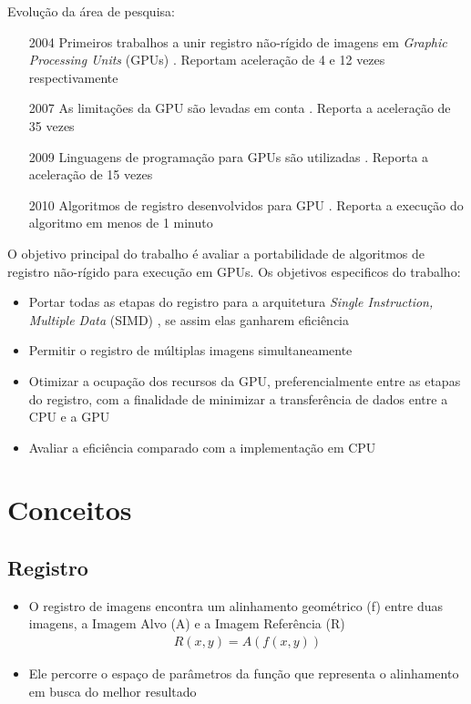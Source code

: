 \documentclass[t]{beamer}
\begin{document}
\begin{frame}
  Evolução da área de pesquisa:
  \begin{itemize}
      \item[2004] Primeiros trabalhos a unir registro não-rígido de imagens em \textit{Graphic Processing Units} (GPUs) 
                  \cite{strzodka2004image} \cite{kohn2006gpu}. Reportam aceleração de 4 e 12 vezes respectivamente
      \item[2007] As limitações da GPU são levadas em conta \cite{grossauer2008gpu}. Reporta a aceleração de 35 vezes
      \item[2009] Linguagens de programação para GPUs são utilizadas \cite{han2009gpu}. Reporta a aceleração de 15 vezes
      \item[2010] Algoritmos de registro desenvolvidos para GPU \cite{modat2010fast}. Reporta a execução do algoritmo em menos de 1 minuto
  \end{itemize}
\end{frame}

\begin{frame}
  O objetivo principal do trabalho é avaliar a portabilidade de algoritmos de registro não-rígido para execução em 
  GPUs.
  Os objetivos especificos do trabalho:
  \begin{itemize}
    \item Portar todas as etapas do registro para a arquitetura \textit{Single Instruction, Multiple Data} (SIMD) 
          \cite{patterson2013computer}, se assim elas ganharem eficiência
    \item Permitir o registro de múltiplas imagens simultaneamente
    \item Otimizar a ocupação dos recursos da GPU, preferencialmente entre as etapas do registro, com a finalidade de 
          minimizar a transferência de dados entre a CPU e a GPU
    \item Avaliar a eficiência comparado com a implementação em CPU
  \end{itemize}
\end{frame}

\section{Conceitos}
\subsection{Registro}

\begin{frame}
  \begin{itemize}
    \item O registro de imagens encontra um alinhamento geométrico (f) entre duas imagens, a Imagem Alvo (A) e a Imagem 
          Referência (R)
    \begin{align}\label{eq:defregistro}
      R(x,y) = A(f(x,y))
    \end{align}
    \item Ele percorre o espaço de parâmetros da função que representa o alinhamento em busca do melhor resultado
  \end{itemize}
\end{frame}
\end{document}
